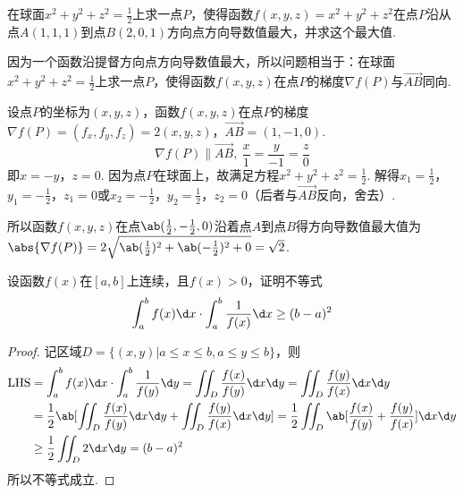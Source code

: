 \begin{problem}
    在球面$x^2+y^2+z^2=\frac12$上求一点$P$，使得函数$f(x,y,z)=x^2+y^2+z^2$在点$P$沿从点$A(1,1,1)$到点$B(2,0,1)$方向点方向导数值最大，并求这个最大值.
\end{problem}
\solute*{\leavevmode\vspace*{\fill}}
\begin{solution}
    因为一个函数沿提督方向点方向导数值最大，所以问题相当于：在球面$x^2+y^2+z^2=\frac12$上求一点$P$，使得函数$f(x,y,z)$在点$P$的梯度$\nabla f(P)$与$\vec{AB}$同向.

    设点$P$的坐标为$(x,y,z)$，函数$f(x,y,z)$在点$P$的梯度$\nabla f(P)=(f_x,f_y,f_z)=2(x,y,z)$，$\vec{AB}=(1,-1,0)$.
    \[\nabla f(P)\parallel\vec{AB},\ \frac x1=\frac{y}{-1}=\frac z0\]
    即$x=-y$，$z=0$. 因为点$P$在球面上，故满足方程$x^2+y^2+z^2=\frac12$. 解得$x_1=\frac12$，$y_1=-\frac12$，$z_1=0$或$x_2=-\frac12$，$y_2=\frac12$，$z_2=0$（后者与$\vec{AB}$反向，舍去）.

    所以函数$f(x,y,z)$在点$\ab(\frac12,-\frac12,0)$沿着点$A$到点$B$得方向导数值最大值为$\abs{\nabla f(P)}=2\sqrt{\ab(\frac12)^2+\ab(-\frac12)^2+0}=\sqrt2$.
\end{solution}

\begin{problem}
    设函数$f(x)$在$[a,b]$上连续，且$f(x)>0$，证明不等式
    \[\int_a^bf(x)\d x\cdot\int_a^b\frac{1}{f(x)}\d x\geq(b-a)^2\]
\end{problem}
\solute*{\leavevmode\vspace*{\fill}}
\begin{solution}
\begin{proof}
    记区域$D=\{(x,y)|a\leq x\leq b,a\leq y\leq b\}$，则
    \[\begin{aligned}
        \text{LHS}&=\int_a^bf(x)\d x\cdot\int_a^b\frac{1}{f(y)}\d y=\iint_D\frac{f(x)}{f(y)}\d x\d y=\iint_D\frac{f(y)}{f(x)}\d x\d y\\
        &=\frac12\ab[\iint_D\frac{f(x)}{f(y)}\d x\d y+\iint_D\frac{f(y)}{f(x)}\d x\d y]=\frac12\iint_D\ab[\frac{f(x)}{f(y)}+\frac{f(y)}{f(x)}]\d x\d y\\
        &\geq\frac12\iint_D2\d x\d y=(b-a)^2
    \end{aligned}\]
    所以不等式成立.
\end{proof}
\end{solution}